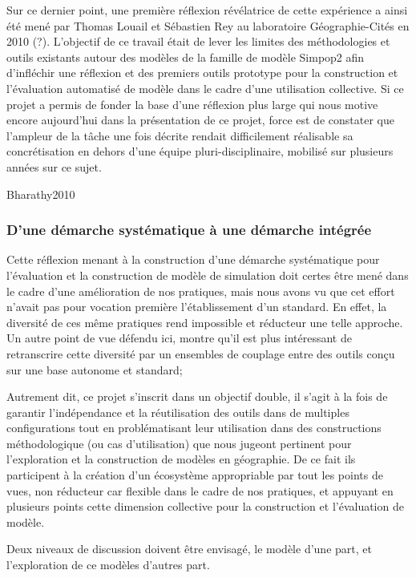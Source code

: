 Sur ce dernier point, une première réflexion révélatrice de cette expérience a ainsi été mené par Thomas Louail et Sébastien Rey au laboratoire Géographie-Cités en 2010 (?). L'objectif de ce travail était de lever les limites des méthodologies et outils existants autour des modèles de la famille de modèle Simpop2 afin d'infléchir une réflexion et des premiers outils prototype pour la construction et l'évaluation automatisé de modèle dans le cadre d'une utilisation collective. Si ce projet a permis de fonder la base d'une réflexion plus large qui nous motive encore aujourd'hui dans la présentation de ce projet, force est de constater que l'ampleur de la tâche une fois décrite rendait difficilement réalisable sa concrétisation en dehors d'une équipe pluri-disciplinaire, mobilisé sur plusieurs années sur ce sujet.

Bharathy2010

\subsubsection{D'une démarche systématique à une démarche intégrée}

Cette réflexion menant à la construction d'une démarche systématique pour l'évaluation et la construction de modèle de simulation doit certes être mené dans le cadre d'une amélioration de nos pratiques, mais nous avons vu que cet effort n'avait pas pour vocation première l'établissement d'un standard. En effet, la diversité de ces même pratiques rend impossible et réducteur une telle approche. 
Un autre point de vue défendu ici, montre qu'il est plus intéressant de retranscrire cette diversité par un ensembles de couplage entre des outils conçu sur une base autonome et standard;

Autrement dit, ce projet s'inscrit dans un objectif double, il s'agit à la fois de garantir l'indépendance et la réutilisation des outils dans de multiples configurations tout en problématisant leur utilisation dans des constructions méthodologique (ou cas d'utilisation) que nous jugeont pertinent pour l'exploration et la construction de modèles en géographie. De ce fait ils participent à la création d'un écosystème appropriable par tout les points de vues, non réducteur car flexible dans le cadre de nos pratiques, et appuyant en plusieurs points cette dimension collective pour la construction et l'évaluation de modèle.

Deux niveaux de discussion doivent être envisagé, le modèle d'une part, et l'exploration de ce modèles d'autres part.

